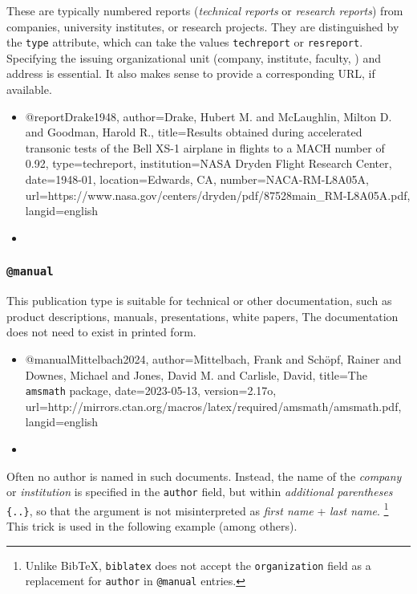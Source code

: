 These are typically numbered reports (\emph{technical reports} or \emph{research
reports}) from companies, university institutes, or research projects. They are
distinguished by the \texttt{type} attribute, which can take the values
\texttt{techreport} or \texttt{resreport}. Specifying the issuing organizational
unit (company, institute, faculty, \etc) and address is essential. It also makes
sense to provide a corresponding URL, if available.
%
\begin{itemize}
\item[]
\begin{GenericCode}[numbers=none]
@report{Drake1948,
  author={Drake, Hubert M. and McLaughlin, Milton D. and Goodman, Harold R.},
  title={Results obtained during accelerated transonic tests of the {Bell} {XS-1} airplane in flights to a {MACH} number of 0.92},
  type={techreport},
  institution={NASA Dryden Flight Research Center},
  date={1948-01},
  location={Edwards, CA},
  number={NACA-RM-L8A05A},
  url={https://www.nasa.gov/centers/dryden/pdf/87528main_RM-L8A05A.pdf},
  langid={english}
}
\end{GenericCode}
\item[\cite{Drake1948}] 
\end{itemize}


\subsubsection{\texttt{\bfseries @manual}}
\label{sec:@manual}

This publication type is suitable for technical or other documentation, such as
product descriptions, manuals, presentations, white papers, \etc The
documentation does not need to exist in printed form.
%
\begin{itemize}
\item[]
\begin{GenericCode}[numbers=none]
@manual{Mittelbach2024,
  author={Mittelbach, Frank and Schöpf, Rainer and Downes, Michael and Jones, David M. and Carlisle, David},
  title={The \texttt{amsmath} package},
  date={2023-05-13},
  version={2.17o},
  url={http://mirrors.ctan.org/macros/latex/required/amsmath/amsmath.pdf},
  langid={english}
}
\end{GenericCode}
\item[\cite{Mittelbach2024}] 
\end{itemize}
%
Often no author is named in such documents. Instead, the name of the
\emph{company} or \emph{institution} is specified in the \texttt{author} field,
but within \emph{additional parentheses} \texttt{\{..\}}, so that the
argument is not misinterpreted as \emph{first name} + \emph{last name}.%
\footnote{Unlike BibTeX, \texttt{biblatex} does not accept the
\texttt{organization} field as a replacement for \texttt{author} in
\texttt{@manual} entries.}
This trick is used in the following example (among others).

